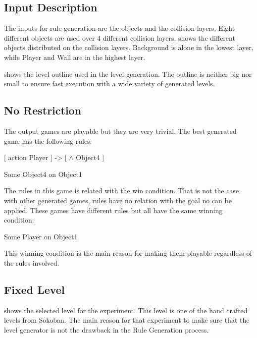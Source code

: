 \subsection{Input Description}
The inputs for rule generation are the objects and the collision layers. Eight different objects are used over 4 different collision layers.  shows the different objects distributed on the collision layers. Background is alone in the lowest layer, while Player and Wall are in the highest layer.


 shows the level outline used in the level generation. The outline is neither big nor small to ensure fast execution with a wide variety of generated levels.


\subsection{No Restriction}
The output games are playable but they are very trivial. The best generated game has the following rules:
\begin{center}
[ action Player ] -> [ $\wedge$ Object4 ]
\end{center}
\begin{center}
Some Object4 on Object1
\end{center}
The rules in this game is related with the win condition. That is not the case with other generated games, rules have no relation with the goal no can be applied. These games have different rules but all have the same winning condition:
\begin{center}
Some Player on Object1
\end{center}
This winning condition is the main reason for making them playable regardless of the rules involved.

\subsection{Fixed Level}
 shows the selected level for the experiment. This level is one of the hand crafted levels from Sokoban. The main reason for that experiment to make sure that the level generator is not the drawback in the Rule Generation process.\\\par

